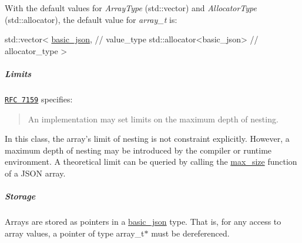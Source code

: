 With the default values for {\itshape Array\-Type} ({\ttfamily std\-::vector}) and {\itshape Allocator\-Type} ({\ttfamily std\-::allocator}), the default value for {\itshape array\-\_\-t} is\-:


\begin{DoxyCode}
std::vector<
  \hyperlink{classnlohmann_1_1basic__json_a53771a7a4f2787125e55f64448f24ce6}{basic\_json}, \textcolor{comment}{// value\_type}
  std::allocator<basic\_json> \textcolor{comment}{// allocator\_type}
>
\end{DoxyCode}


\subparagraph*{Limits}

\href{http://rfc7159.net/rfc7159}{\tt R\-F\-C 7159} specifies\-: \begin{quotation}
An implementation may set limits on the maximum depth of nesting.

\end{quotation}


In this class, the array's limit of nesting is not constraint explicitly. However, a maximum depth of nesting may be introduced by the compiler or runtime environment. A theoretical limit can be queried by calling the \hyperlink{classnlohmann_1_1basic__json_a7936417b875b7ec737f77ef84bbf7871}{max\-\_\-size} function of a J\-S\-O\-N array.

\subparagraph*{Storage}

Arrays are stored as pointers in a \hyperlink{classnlohmann_1_1basic__json}{basic\-\_\-json} type. That is, for any access to array values, a pointer of type {\ttfamily array\-\_\-t$\ast$} must be dereferenced.

